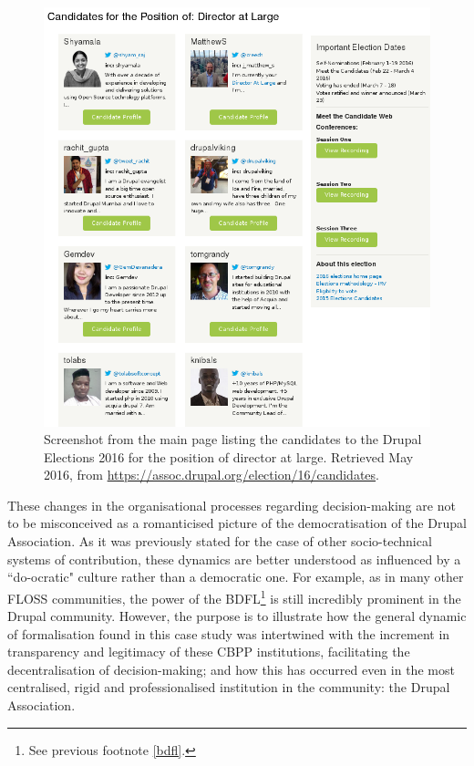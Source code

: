 \begin{figure}[H]
\centering
\includegraphics[scale=0.6]{img/offline/elections_16}
\caption[List of candidates to the Drupal Elections 2016 for the position of director at large]%
{Screenshot from the main page listing the candidates to the Drupal Elections 2016 for the position of director at large. Retrieved  May 2016, from \url{https://assoc.drupal.org/election/16/candidates}.}
\label{da-election16}
\end{figure}

These changes in the organisational processes regarding decision-making are not to be misconceived as a romanticised picture of the democratisation of the Drupal Association. As it was previously stated for the case of other socio-technical systems of contribution, these dynamics are better understood as influenced by a ``do-ocratic" culture rather than a democratic one. For example, as in many other FLOSS communities, the power of the BDFL\footnote{See previous footnote \ref{bdfl}.} is still incredibly prominent in the Drupal community. However, the purpose is to illustrate how the general dynamic of formalisation found in this case study was intertwined with the increment in transparency and legitimacy of these CBPP institutions, facilitating the decentralisation of decision-making; and how this has occurred even in the most centralised, rigid and professionalised institution in the community: the Drupal Association.

